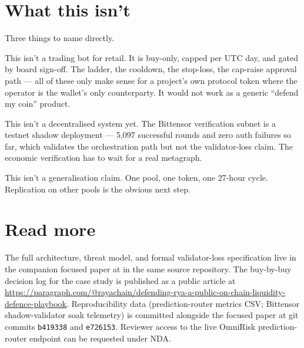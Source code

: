 \documentclass[11pt,a4paper]{article}
\begin{document}
\section*{What this isn't}

Three things to name directly.

This isn't a trading bot for retail. It is buy-only, capped per UTC
day, and gated by board sign-off. The ladder, the cooldown, the
stop-loss, the cap-raise approval path --- all of these only make sense
for a project's own protocol token where the operator is the wallet's
only counterparty. It would not work as a generic ``defend my coin''
product.

This isn't a decentralised system yet. The Bittensor verification
subnet is a testnet shadow deployment --- 5{,}097 successful rounds
and zero auth failures so far, which validates the orchestration path
but not the validator-loss claim. The economic verification has to
wait for a real metagraph.

This isn't a generalisation claim. One pool, one token, one 27-hour
cycle. Replication on other pools is the obvious next step.

\section*{Read more}

The full architecture, threat model, and formal validator-loss
specification live in the companion focused paper at
 in the same
source repository. The buy-by-buy decision log for the case study is
published as a public article at
\url{https://paragraph.com/@rayachain/defending-rya-a-public-on-chain-liquidity-defence-playbook}.
Reproducibility data (prediction-router metrics CSV; Bittensor
shadow-validator soak telemetry) is committed alongside the focused
paper at git commits \texttt{b419338} and \texttt{e726153}. Reviewer
access to the live OmniRisk prediction-router endpoint can be requested
under NDA.
\end{document}
